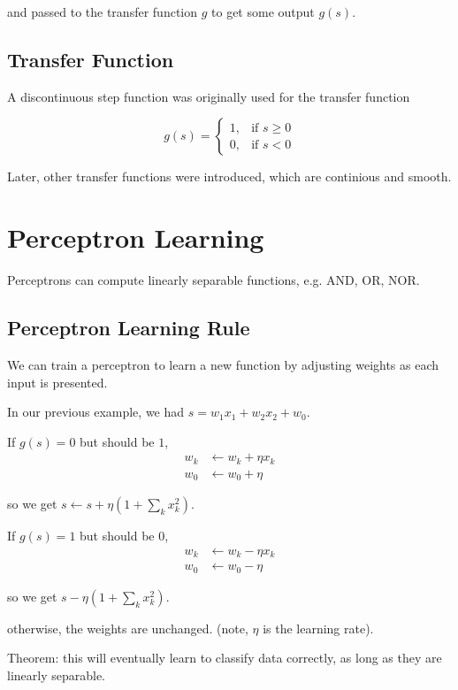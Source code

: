 and passed to the transfer function $g$ to get some output $g(s)$.

\subsection{Transfer Function}
A discontinuous step function was originally used for the transfer function

\begin{displaymath}
    g(s) = \left\{
        \begin{array}{lr}
            1, & \text{if } s \geq 0\\
            0, & \text{if } s < 0
        \end{array}
    \right.
\end{displaymath}

Later, other transfer functions were introduced, which are continious and
smooth.

\section{Perceptron Learning}
Perceptrons can compute linearly separable functions, e.g. AND, OR, NOR.

\subsection{Perceptron Learning Rule}
We can train a perceptron to learn a new function by adjusting weights as each
input is presented.

In our previous example, we had $s = w_1x_1 + w_2x_2 + w_0$.

If $g(s) = 0$ but should be $1$,
\begin{align*}
    w_k & \leftarrow w_k + \eta x_k\\
    w_0 & \leftarrow w_0 + \eta
\end{align*}

so we get $s \leftarrow s + \eta(1 + \sum_k x_k^2)$.

If $g(s) = 1$ but should be $0$,
\begin{align*}
    w_k & \leftarrow w_k - \eta x_k\\
    w_0 & \leftarrow w_0 - \eta
\end{align*}

so we get $s - \eta(1 + \sum_k x_k^2)$.

otherwise, the weights are unchanged. (note, $\eta$ is the learning rate).

Theorem: this will eventually learn to classify data correctly, as long as they
are linearly separable.

